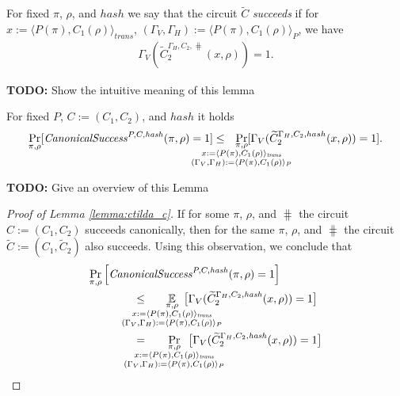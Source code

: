 For fixed $\pi$, $\rho$, and $hash$ we say that the circuit $\widetilde{C}$ \textit{succeeds} if
for $x := \langle P(\pi), C_1(\rho) \rangle_{\mathit{trans}}$,
$(\Gamma_V, \Gamma_H) := \langle P(\pi), C_1(\rho) \rangle_{P}$, we have
\begin{align*}
\Gamma_V(\widetilde{C}_2^{\Gamma_H, C_2, \hash}(x, \rho)) = 1.
\end{align*}
%
\begin{todo}
  \textbf{TODO:} Show the intuitive meaning of this lemma
\end{todo}

\begin{lemma}
  \label{lemma:ctilda_c}
  For fixed $P$, $C := (C_1, C_2)$, and $hash$ it holds
  \begin{align*}
    \underset{\pi, \rho}{\Pr}[\CanonicalSuccess^{P, C, \hash}(\pi, \rho) = 1]
    \leq
    \mkern13mu
    \underset{
      \mathclap{
      \substack{
        \pi, \rho \\
        x := \langle P(\pi), C_1(\rho) \rangle_{\mathit{trans}} \\
        (\Gamma_V, \Gamma_H) := \langle P(\pi), C_1(\rho) \rangle_{P}}}}
  {\Pr}[\Gamma_V(\widetilde{C}_2^{\Gamma_H, C_2, hash}(x, \rho)) = 1].
  \end{align*}
\end{lemma}
%
\begin{todo}
  \textbf{TODO:} Give an overview of this Lemma
\end{todo}
\begin{proof}[Proof of Lemma \ref{lemma:ctilda_c}]
If for some $\pi$, $\rho$, and $\hash$ the circuit $C := (C_1, C_2)$ succeeds canonically,
then for the same $\pi$, $\rho$, and $\hash$ the circuit $\widetilde{C} := (C_1, \widetilde{C}_2)$ also succeeds.
Using this observation, we conclude that
\begin{align*}
  &\underset{\pi, \rho}{\Pr}\left[\CanonicalSuccess^{P, C, \hash}(\pi, \rho) = 1\right] \\
  &\IndII \leq
  \mkern33mu
    \underset{
      \mathclap{
        \substack{\pi, \rho \\
        x := \langle P(\pi), C_1(\rho) \rangle_{\mathit{trans}} \\
        (\Gamma_V, \Gamma_H) := \langle P(\pi), C_1(\rho) \rangle_{P}
      }}}
    {\mathbb{E}}\mkern13mu\big[\Gamma_V(\widetilde{C}_2^{\Gamma_H, C_2, \hash}(x, \rho)) = 1\big] \\
  &\IndII =
  \mkern33mu
    \underset{
      \mathclap{
        \substack{\pi, \rho \\
        x := \langle P(\pi), C_1(\rho) \rangle_{\mathit{trans}} \\
        (\Gamma_V, \Gamma_H) := \langle P(\pi), C_1(\rho) \rangle_{P}
      }}}
    {\Pr}\mkern13mu\big[\Gamma_V(\widetilde{C}_2^{\Gamma_H, C_2, \hash}(x, \rho)) = 1\big]
\end{align*}
\end{proof}
